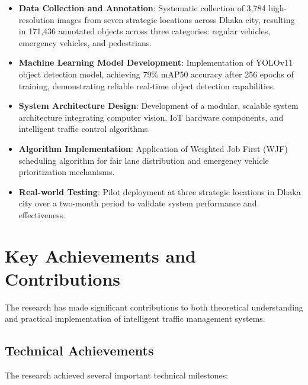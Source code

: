 \begin{itemize}
    \item \textbf{Data Collection and Annotation}: Systematic collection of 3,784 high-resolution images from seven strategic locations across Dhaka city, resulting in 171,436 annotated objects across three categories: regular vehicles, emergency vehicles, and pedestrians.
    
    \item \textbf{Machine Learning Model Development}: Implementation of YOLOv11 object detection model, achieving 79\% mAP50 accuracy after 256 epochs of training, demonstrating reliable real-time object detection capabilities.
    
    \item \textbf{System Architecture Design}: Development of a modular, scalable system architecture integrating computer vision, IoT hardware components, and intelligent traffic control algorithms.
    
    \item \textbf{Algorithm Implementation}: Application of Weighted Job First (WJF) scheduling algorithm for fair lane distribution and emergency vehicle prioritization mechanisms.
    
    \item \textbf{Real-world Testing}: Pilot deployment at three strategic locations in Dhaka city over a two-month period to validate system performance and effectiveness.
\end{itemize}

\section{Key Achievements and Contributions}
\label{sec:key_achievements}

The research has made significant contributions to both theoretical understanding and practical implementation of intelligent traffic management systems.

\subsection{Technical Achievements}
The research achieved several important technical milestones:

